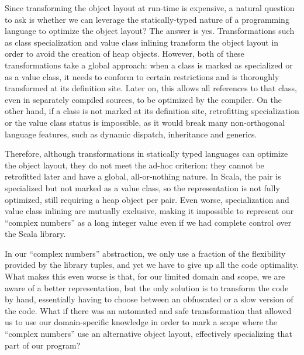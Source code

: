 Since transforming the object layout at run-time is expensive, a natural question to ask is whether we can leverage the statically-typed nature of a programming language to optimize the object layout? The answer is yes. Transformations such as class specialization and value class inlining transform the object layout in order to avoid the creation of heap objects. However, both of these transformations take a global approach: when a class is marked as specialized or as a value class, it needs to conform to certain restrictions and is thoroughly transformed at its definition site. Later on, this allows all references to that class, even in separately compiled sources, to be optimized by the compiler. On the other hand, if a class is not marked at its definition site, retrofitting specialization or the value class status is impossible, as it would break many non-orthogonal language features, such as dynamic dispatch, inheritance and generics.

Therefore, although transformations in statically typed languages can optimize the object layout, they do not meet the ad-hoc criterion: they cannot be retrofitted later and have a global, all-or-nothing nature. In Scala, the pair is specialized but not marked as a value class, so the representation is not fully optimized, still requiring a heap object per pair. Even worse, specialization and value class inlining are mutually exclusive, making it impossible to represent our ``complex numbers'' as a long integer value even if we had complete control over the Scala library.

In our ``complex numbers'' abstraction, we only use a fraction of the flexibility provided by the library tuples, and yet we have to give up all the code optimality. What makes this even worse is that, for our limited domain and scope, we are aware of a better representation, but the only solution is to transform the code by hand, essentially having to choose between an obfuscated or a slow version of the code. What if there was an automated and safe transformation that allowed us to use our domain-specific knowledge in order to mark a scope where the ``complex numbers'' use an alternative object layout, effectively specializing that part of our program?

